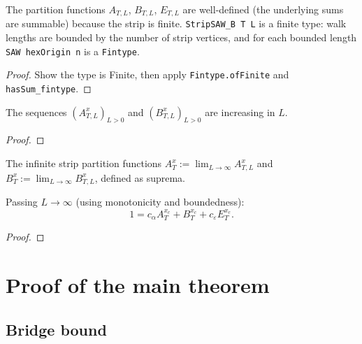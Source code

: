 \begin{lemma}\label{lem:partition_summable}
\leanok
{}
  The partition functions $A_{T,L}$, $B_{T,L}$, $E_{T,L}$ are well-defined
  (the underlying sums are summable) because the strip is finite.
  \texttt{StripSAW\_B T L} is a finite type: walk lengths are bounded
  by the number of strip vertices, and for each bounded length
  \texttt{SAW hexOrigin n} is a \texttt{Fintype}.
\end{lemma}
\begin{proof}
\leanok
  Show the type is Finite, then apply \texttt{Fintype.ofFinite} and
  \texttt{hasSum\_fintype}.
\end{proof}

\begin{lemma}\label{lem:AB_monotone}
\leanok
{}
  The sequences $(A_{T,L}^x)_{L>0}$ and $(B_{T,L}^x)_{L>0}$ are increasing in $L$.
\end{lemma}
\begin{proof}
\leanok
\end{proof}

\begin{definition}\label{def:ABE_inf}
\leanok
{}
  The infinite strip partition functions $A_T^x := \lim_{L \to \infty} A_{T,L}^x$
  and $B_T^x := \lim_{L \to \infty} B_{T,L}^x$, defined as suprema.
\end{definition}

\begin{theorem}\label{thm:strip_identity_limit}
\leanok
{}
  Passing $L \to \infty$ (using monotonicity and boundedness):
  \[ 1 = c_\alpha A_T^{x_c} + B_T^{x_c} + c_\varepsilon E_T^{x_c}. \]
\end{theorem}
\begin{proof}
\leanok
\end{proof}


\chapter{Proof of the main theorem}\label{chap:proof}

\section{Bridge bound}

